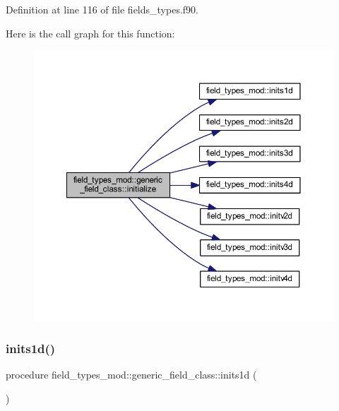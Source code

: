 Definition at line 116 of file fields\+\_\+types.\+f90.

Here is the call graph for this function\+:
\nopagebreak
\begin{figure}[H]
\begin{center}
\leavevmode
\includegraphics[width=350pt]{structfield__types__mod_1_1generic__field__class_ae53b0ee80d41ad66189ad515edc23a3c_cgraph}
\end{center}
\end{figure}
\mbox{\label{structfield__types__mod_1_1generic__field__class_a967be57b1342ca6ebd74b9b5227f893a}} 
\subsubsection{\texorpdfstring{inits1d()}{inits1d()}}
{\footnotesize\ttfamily procedure field\+\_\+types\+\_\+mod\+::generic\+\_\+field\+\_\+class\+::inits1d (\begin{DoxyParamCaption}{ }\end{DoxyParamCaption})\hspace{0.3cm}{\ttfamily [private]}}



